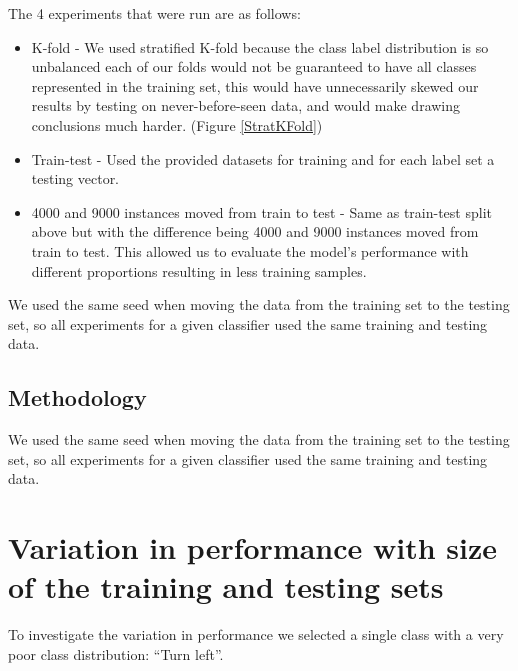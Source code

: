 \documentclass[11pt]{article}
\begin{document}
The 4 experiments that were run are as follows:
\begin{itemize}
  \item K-fold - We used stratified K-fold because the class label distribution is so unbalanced each of our folds would not be guaranteed to have all classes represented in the training set, this would have unnecessarily skewed our results by testing on never-before-seen data, and would make drawing conclusions much harder. (Figure \ref{StratKFold})
  \item Train-test - Used the provided datasets for training and for each label set a testing vector. 
  \item 4000 and 9000 instances moved from train to test - Same as train-test split above but with the difference being 4000  and 9000 instances moved from train to test. This allowed us to evaluate the model’s performance with different proportions resulting in less training samples.
\end{itemize}

We used the same seed when moving the data from the training set to the testing set, so all experiments for a given classifier used the same training and testing data.



\subsection{Methodology}
We used the same seed when moving the data from the training set to the testing set, so all experiments for a given classifier used the same training and testing data.

\par

\newpage
\section{Variation in performance with size of the training and testing sets}
To investigate the variation in performance we selected a single class with a very poor class distribution: “Turn left”.
\end{document}
